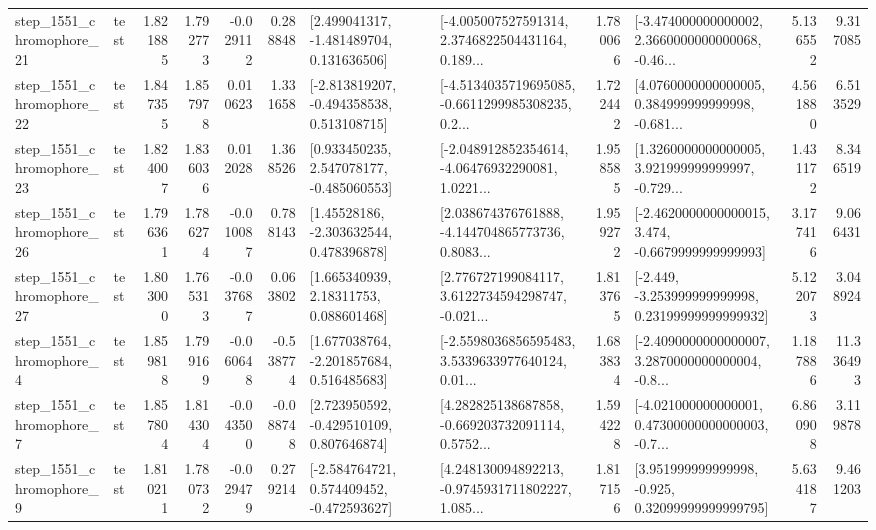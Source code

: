 \begin{tabular}{llrrrrllrlrr}
 step\_1551\_chromophore\_21 &      test &      1.821885 &    1.792773 &     -0.029112 &  0.288848 &    [2.499041317, -1.481489704, 0.131636506] &  [-4.005007527591314, 2.3746822504431164, 0.189... &       1.780066 &  [-3.474000000000002, 2.3660000000000068, -0.46... &            5.136552 &          9.317085 \\
 step\_1551\_chromophore\_22 &      test &      1.847355 &    1.857978 &      0.010623 &  1.331658 &   [-2.813819207, -0.494358538, 0.513108715] &  [-4.5134035719695085, -0.6611299985308235, 0.2... &       1.722442 &  [4.0760000000000005, 0.384999999999998, -0.681... &            4.561880 &          6.513529 \\
 step\_1551\_chromophore\_23 &      test &      1.824007 &    1.836036 &      0.012028 &  1.368526 &    [0.933450235, 2.547078177, -0.485060553] &  [-2.048912852354614, -4.06476932290081, 1.0221... &       1.958585 &  [1.3260000000000005, 3.921999999999997, -0.729... &            1.431172 &          8.346519 \\
 step\_1551\_chromophore\_26 &      test &      1.796361 &    1.786274 &     -0.010087 &  0.788143 &     [1.45528186, -2.303632544, 0.478396878] &  [2.038674376761888, -4.144704865773736, 0.8083... &       1.959272 &  [-2.4620000000000015, 3.474, -0.6679999999999993] &            3.177416 &          9.066431 \\
 step\_1551\_chromophore\_27 &      test &      1.803000 &    1.765313 &     -0.037687 &  0.063802 &      [1.665340939, 2.18311753, 0.088601468] &  [2.776727199084117, 3.6122734594298747, -0.021... &       1.813765 &  [-2.449, -3.253999999999998, 0.23199999999999932] &            5.122073 &          3.048924 \\
  step\_1551\_chromophore\_4 &      test &      1.859818 &    1.799169 &     -0.060648 & -0.538774 &    [1.677038764, -2.201857684, 0.516485683] &  [-2.5598036856595483, 3.5339633977640124, 0.01... &       1.683834 &  [-2.4090000000000007, 3.2870000000000004, -0.8... &            1.187886 &         11.336493 \\
  step\_1551\_chromophore\_7 &      test &      1.857804 &    1.814304 &     -0.043500 & -0.088748 &    [2.723950592, -0.429510109, 0.807646874] &  [4.282825138687858, -0.669203732091114, 0.5752... &       1.594228 &  [-4.021000000000001, 0.47300000000000003, -0.7... &            6.860908 &          3.119878 \\
  step\_1551\_chromophore\_9 &      test &      1.810211 &    1.780732 &     -0.029479 &  0.279214 &   [-2.584764721, 0.574409452, -0.472593627] &  [4.248130094892213, -0.9745931711802227, 1.085... &       1.817156 &   [3.951999999999998, -0.925, 0.32099999999999795] &            5.634187 &          9.461203 \\

\end{tabular}
